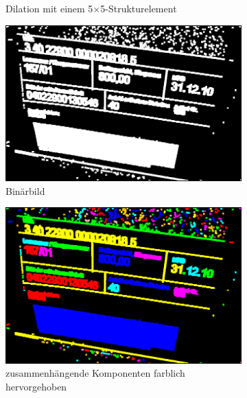 \begin{figure}[H]
\begin{subfigure}[t]{.32\columnwidth}
    \caption{\scriptsize Dilation mit einem 5$\times$5-Strukturelement}
  \end{subfigure}
  \begin{subfigure}[t]{.32\columnwidth}
    \centering
    \includegraphics[width=\columnwidth]{img/techniques/candidate-extraction/binary}
    \caption{\scriptsize Binärbild}
  \end{subfigure}
  \begin{subfigure}[t]{.32\columnwidth}
    \centering
    \includegraphics[width=\columnwidth]{img/techniques/candidate-extraction/components}
    \caption{\scriptsize zusammenhängende Komponenten farblich hervorgehoben}
  \end{subfigure}
  \begin{subfigure}[t]{.32\columnwidth}
    \centering

\end{subfigure}
\end{figure}
